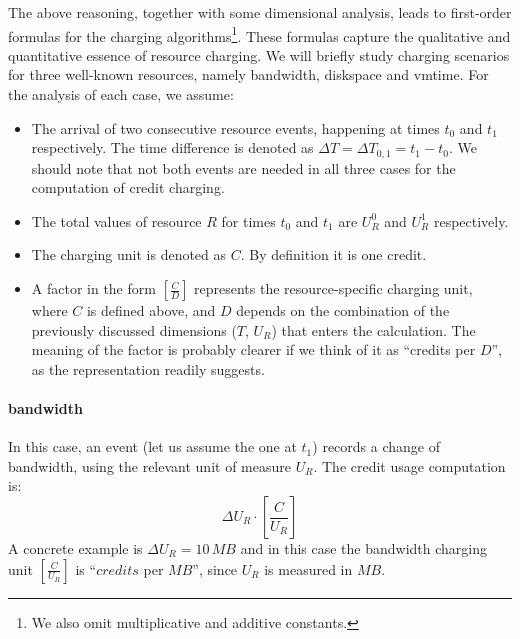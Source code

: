 \documentclass[preprint,10pt]{sigplanconf}
\newcommand{\MB}[1]{\ensuremath{#1\,MB}}
\begin{document}
The above reasoning, together with some dimensional analysis, leads to first-order formulas for the charging algorithms\footnote{We also omit multiplicative and additive constants.}. These formulas capture the qualitative and quantitative essence of resource charging. We will briefly  study charging scenarios for three well-known resources, namely \textsf{bandwidth}, \textsf{diskspace} and \textsf{vmtime}. For the analysis of each case, we assume: 
\begin{itemize}
\item The arrival of two consecutive resource events, happening at times $t_0$ and $t_1$ respectively. The time difference is denoted as $\Delta T = \Delta T_{0, 1} = t_1 - t_0$. We should note that not both events are needed in all three cases for the computation of credit charging.

\item The total values of resource $R$ for times $t_0$ and $t_1$ are $U_R^0$ and $U_R^1$ respectively.

\item The charging unit is denoted as $C$. By definition it is one credit.

\item A factor in the form $[\frac{C}{D}]$ represents the resource-specific charging unit, where $C$ is defined above, and $D$ depends on the combination of the previously discussed dimensions ($T$, $U_R$) that enters the calculation. The meaning of the factor is probably clearer if we think of it as ``credits per $D$'', as the representation readily suggests.
\end{itemize}

\paragraph{\textsf{bandwidth}}
In this case, an event (let us assume the one at $t_1$) records a change of bandwidth, using the relevant unit of measure $U_R$.  The credit usage computation is:
\begin{equation}
\label{eq:bandwidth}
\Delta U_R \cdot  [ \frac{C}{U_R} ]
\end{equation}
A concrete example is $\Delta U_R = \MB{10}$ and in this case the bandwidth charging unit $[ \frac{C}{U_R} ]$ is ``$credits$ per $MB$'', since $U_R$ is measured in $MB$.
\end{document}
